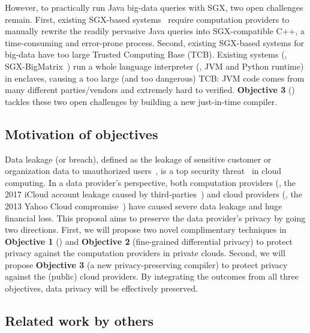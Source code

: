 However, to practically run Java big-data queries with SGX, two open challenges 
remain. First, existing SGX-based systems~\cite{opaque:nsdi17} require 
computation providers to manually rewrite the readily pervasive Java 
queries into SGX-compatible C++, a time-consuming and error-prone process.
Second, existing SGX-based systems for big-data have too large Trusted 
Computing Base (TCB). Existing systems 
(\eg, SGX-BigMatrix~\cite{bigmatrix:ccs17}) run a whole language interpreter 
(\eg, JVM and Python runtime) in enclaves, causing a too large (and too 
dangerous) TCB: JVM code comes from many different parties/vendors and 
extremely hard to verified. \textbf{Objective 3} () tackles
these two open challenges by building a new just-in-time compiler.

\vspace{-.15in}\subsection{Motivation of objectives} 
\label{sec:motivation}\vspace{-.075in}


Data leakage (or breach), defined as the leakage of sensitive customer or 
organization data to unauthorized users~\cite{kazim2015survey}, is a top 
security threat~\cite{top-threats,privacy:bigdata:rand} in cloud computing. In 
a data provider's perspective, both computation providers (\eg, the 2017 iCloud 
account leakage caused by third-parties~\cite{icloud-breach}) and cloud 
providers (\eg, the 2013 Yahoo Cloud compromise~\cite{yahoo-dropbox-breach}) 
have caused severe data leakage and huge financial loss. This proposal aims to 
preserve the data provider's privacy by going two directions. First, we will 
propose two novel complimentary techniques in \textbf{Objective 1} (\kakute) and 
\textbf{Objective 2} (fine-grained differential privacy) to protect privacy 
against the computation providers in private clouds. Second, we will propose 
\textbf{Objective 3} (a new privacy-preserving compiler) to protect privacy 
against the (public) cloud providers. By integrating the outcomes from all three 
objectives, data privacy will be effectively preserved.

\vspace{-.15in}\subsection{Related work by others} 
\label{sec:others-work}\vspace{-.075in}

